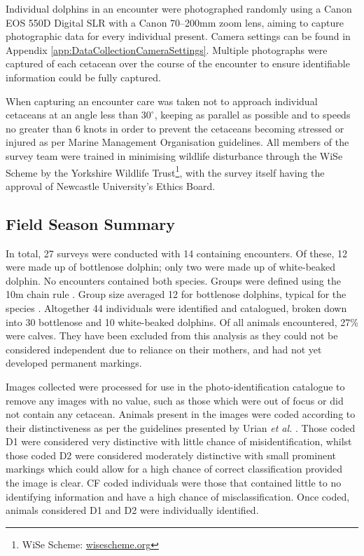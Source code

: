 Individual dolphins in an encounter were photographed randomly using a Canon EOS 550D Digital SLR with a Canon 70–200mm zoom lens, aiming to capture photographic data for every individual present. Camera settings can be found in Appendix \ref{app:DataCollectionCameraSettings}. Multiple photographs were captured of each cetacean over the course of the encounter to ensure identifiable information could be fully captured. 

When capturing an encounter care was taken not to approach individual cetaceans at an angle less than $30^{\circ}$, keeping as parallel as possible and to speeds no greater than 6 knots in order to prevent the cetaceans becoming stressed or injured as per Marine Management Organisation guidelines. All members of the survey team were trained in minimising wildlife disturbance through the WiSe Scheme by the Yorkshire Wildlife Trust\footnote{WiSe Scheme: \href{https://www.wisescheme.org/}{wisescheme.org}}, with the survey itself having the approval of Newcastle University's Ethics Board.

\subsection{Field Season Summary}\label{ch:NDD,sec:dataCollection,sub:summary}

In total, 27 surveys were conducted with 14 containing encounters. Of these, 12 were made up of bottlenose dolphin; only two were made up of white-beaked dolphin. No encounters contained both species. Groups were defined using the 10m chain rule \cite{smolker_sex_1992}. Group size averaged 12 for bottlenose dolphins, typical for the species \cite{shane_ecology_1986}. Altogether 44 individuals were identified and catalogued, broken down into 30 bottlenose and 10 white-beaked dolphins. Of all animals encountered, 27\% were calves. They have been excluded from this analysis as they could not be considered independent due to reliance on their mothers, and had not yet developed permanent markings.

Images collected were processed for use in the photo-identification catalogue to remove any images with no value, such as those which were out of focus or did not contain any cetacean. Animals present in the images were coded according to their distinctiveness as per the guidelines presented by Urian \textit{et al.} \cite{urian_recommendations_2015}. Those coded D1 were considered very distinctive with little chance of misidentification, whilst those coded D2 were considered moderately distinctive with small prominent markings which could allow for a high chance of correct classification provided the image is clear. CF coded individuals were those that contained little to no identifying information and have a high chance of misclassification. Once coded, animals considered D1 and D2 were individually identified.

